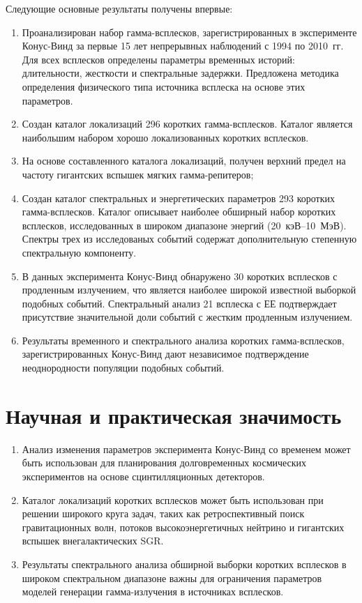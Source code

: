 Следующие основные результаты получены впервые:
\begin{enumerate}
\item Проанализирован набор гамма-всплесков, зарегистрированных в эксперименте 
 Конус-Винд за первые 15 лет непрерывных наблюдений с 1994 по 2010~гг. Для всех 
 всплесков определены параметры временных историй: длительности, жесткости и спектральные задержки.
 Предложена методика определения физического типа источника всплеска на основе этих параметров.
\item Создан каталог локализаций 296 коротких гамма-всплесков. Каталог является 
 наибольшим набором хорошо локализованных коротких всплесков. 
\item На основе составленного каталога локализаций,
 получен верхний предел на частоту гигантских вспышек мягких гамма-репитеров;
\item Создан каталог спектральных и энергетических параметров 293 коротких гамма-всплесков. 
 Каталог описывает наиболее обширный набор коротких всплесков, исследованных 
 в широком диапазоне энергий (20~кэВ--10~МэВ). Спектры трех из исследованых событий 
 содержат дополнительную степенную спектральную компоненту.
\item В данных эксперимента Конус-Винд обнаружено 30 коротких всплесков с продленным излучением, 
что является наиболее широкой известной выборкой подобных событий.
Спектральный анализ 21 всплеска с ЕЕ подтверждает присутствие значительной доли 
событий с жестким продленным излучением.   
\item Результаты временного и спектрального анализа коротких гамма-всплесков, 
 зарегистрированных Конус-Винд дают независимое подтверждение неоднородности популяции подобных событий.
\end{enumerate}


\section*{Научная и практическая значимость}

\begin{enumerate}
\item Анализ изменения параметров эксперимента Конус-Винд со временем может быть использован
 для планирования долговременных космических экспериментов на основе сцинтилляционных детекторов.
\item Каталог локализаций коротких всплесков может быть использован при решении 
 широкого круга задач, таких как ретроспективный поиск гравитационных волн, потоков высокоэнергетичных нейтрино 
 и гигантских вспышек внегалактических SGR.
\item Результаты спектрального анализа обширной выборки коротких всплесков 
в широком спектральном диапазоне важны для ограничения параметров
моделей генерации гамма-излучения в источниках всплесков.
\end{enumerate}

